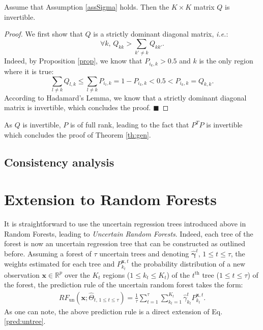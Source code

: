\begin{proposition}
Assume that Assumption \eqref{assSigma} holds. Then the $K\times K$ matrix $Q$ is invertible.
\end{proposition}
\begin{proof}
We first show that $Q$ is a strictly dominant diagonal matrix, \textit{i.e.}:
%
\[
\forall k,\,Q_{kk}>\sum_{k'\neq k}Q_{kk'}.
\]
%
Indeed, by  Proposition \ref{prop}, we know that $P_{i_k,k}>0.5$ and $k$ is the only region where it is true:
\[
\sum_{l\neq k}Q_{l,k}\leq \sum_{l\neq k}P_{i_l,k} = 1 - P_{i_k,k} <0.5<P_{i_k,k}=Q_{k,k}.
\]
%
According to Hadamard's Lemma, we know that a strictly dominant diagonal matrix is invertible, which concludes the proof.
\hfill $\blacksquare$
\end{proof}
%
As $Q$ is invertible, $P$ is of full rank, leading to the fact that $P^T P$ is invertible which concludes the proof of Theorem \ref{th:gen}.

\subsection{Consistency analysis}

\section{Extension to Random Forests}
\label{sec:RF}

It is straightforward to use the uncertain regression trees introduced above in Random Forests, leading to \textit{Uncertain Random Forests}. Indeed, each tree of the forest is now an uncertain regression tree that can be constructed as outlined before. Assuming a forest of $\tau$ uncertain trees and denoting $\hat{\boldsymbol{\gamma}}^t, \, 1 \le t \le \tau$, the weights estimated for each tree and $P^{\boldsymbol{x},t}_{k_t}$ the probability distribution of a new observation $\boldsymbol{x}\in \mathbb{R}^p$ over the $K_t$ regions ($1 \le k_t \le K_t$) of the $t^{\text{th}}$ tree ($1 \le t \le \tau$) of the forest, the prediction rule of the uncertain random forest takes the form:
%
\begin{align}
    RF_{\text{un}}\left(\boldsymbol{x}; \hat{\Theta}_{t, \, 1 \le t \le \tau}\right) = \frac{1}{\tau} \sum_{t=1}^{\tau} \sum_{k_t=1}^{K_t} \hat{\gamma}^t_{k_t} P^{\boldsymbol{x},t}_{k_t}.
  \label{pred:unrf}
\end{align}
%
As one can note, the above prediction rule is a direct extension of Eq. \eqref{pred:untree}.


